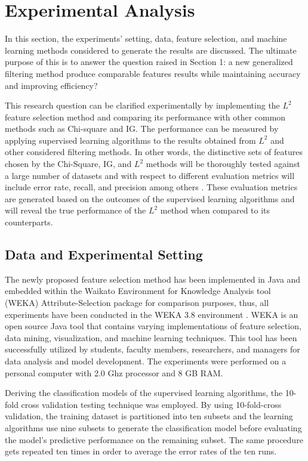 \documentclass[review]{elsarticle}
\begin{document}
\section{Experimental Analysis }

In this section, the experiments’ setting, data, feature selection, and machine learning methods considered to generate the results are discussed. The ultimate purpose of this is to answer the question raised in Section 1: a new generalized filtering method produce comparable features results while maintaining accuracy and improving efficiency?

This research question can be clarified experimentally by implementing the $ L^2 $ feature selection method and comparing its performance with other common methods such as Chi-square and IG. The performance can be measured by applying supervised learning algorithms to the results obtained from $ L^2 $ and other considered filtering methods. In other words, the distinctive sets of features chosen by the Chi-Square, IG, and $ L^2 $ methods will be thoroughly tested against a large number of datasets and with respect to different evaluation metrics will include error rate, recall, and precision among others \cite{Hegde2014, Thabtah2018}. These evaluation metrics are generated based on the outcomes of the supervised learning algorithms and will reveal the true performance of the $ L^2 $ method when compared to its counterparts.

\subsection{Data and Experimental Setting }

The newly proposed feature selection method has been implemented in Java and embedded within the Waikato Environment for Knowledge Analysis tool (WEKA) Attribute-Selection package for comparison purposes, thus, all experiments have been conducted in the WEKA 3.8 environment \cite{Hall2009}. WEKA is an open source Java tool that contains varying implementations of feature selection, data mining, visualization, and machine learning techniques. This tool has been successfully utilized by students, faculty members, researchers, and managers for data analysis and model development. The experiments were performed on a personal computer with 2.0 Ghz processor and 8 GB RAM. 

Deriving the classification models of the supervised learning algorithms, the 10-fold cross validation testing technique was employed. By using 10-fold-cross validation, \cite{Shahamiri2014}   the training dataset is partitioned into ten subsets and the learning algorithms use nine subsets to generate the classification model before evaluating the model’s predictive performance on the remaining subset. The same procedure gets repeated ten times in order to average the error rates of the ten runs.
\end{document}
